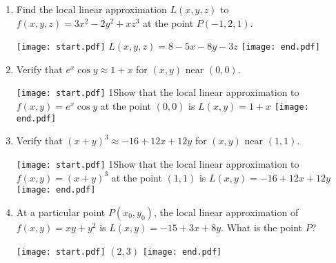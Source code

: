 \documentclass[12pt]{article}
\begin{document}
\begin{enumerate}
\item Find the local linear approximation $L(x,y,z)$ to $f(x,y,z)=3x^2-2y^2+xz^3$ at the point $P(-1,2,1)$.

\texttt{[image: start.pdf]}
{{$L(x,y,z)=8-5x-8y-3z$}}
\texttt{[image: end.pdf]}


\item Verify that $e^x\cos{y} \approx 1+x$ for $(x,y)$ near $(0,0)$.

\texttt{[image: start.pdf]}
{{{1\linewidth}{Show that the local linear approximation to $f(x,y)=e^x\cos{y}$ at the point $(0,0)$ is $L(x,y)=1+x$}}}
\texttt{[image: end.pdf]}


\item Verify that $(x+y)^3 \approx -16+12x+12y$ for $(x,y)$ near $(1,1)$.

\texttt{[image: start.pdf]}
{{{1\linewidth}{Show that the local linear approximation to $f(x,y)=(x+y)^3$ at the point $(1,1)$ is $L(x,y)=-16+12x+12y$}}}
\texttt{[image: end.pdf]}


\item At a particular point $P(x_0,y_0)$, the local linear approximation of $f(x,y)=xy+y^2$ is $L(x,y)=-15+3x+8y$.  What is the point $P$?

\texttt{[image: start.pdf]}
{{$(2,3)$}}
\texttt{[image: end.pdf]}


\end{enumerate}
\end{document}
